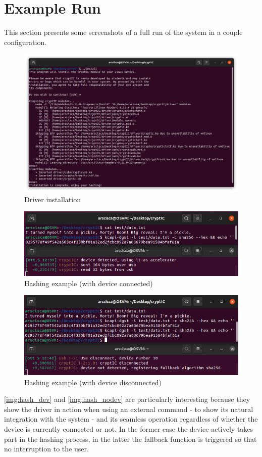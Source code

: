 \section{Example Run}
This section presents some screenshots of a full run of the system in a couple configuration.

\begin{figure}[htb]
		\center
		\includegraphics[width=\textwidth]{img/install.png}
		\caption{Driver installation}
\end{figure}

\begin{figure}[htb]
		\center
		\includegraphics[width=\textwidth]{img/hash_device.png}
		\caption{Hashing example (with device connected)}
    \label{img:hash_dev}
\end{figure}
\begin{figure}[htb]
		\center
		\includegraphics[width=\textwidth]{img/hash_nodev.png}
		\caption{Hashing example (with device disconnected)}
    \label{img:hash_nodev}
\end{figure}
\autoref{img:hash_dev} and \autoref{img:hash_nodev} are particularly interesting because they show the driver in action when using an external command - to show its natural integration with the system - and its seamless operation regardless of whether the device is currently connected or not. In the former case the device actively takes part in the hashing process, in the latter the fallback function is triggered so that no interruption to the user.


